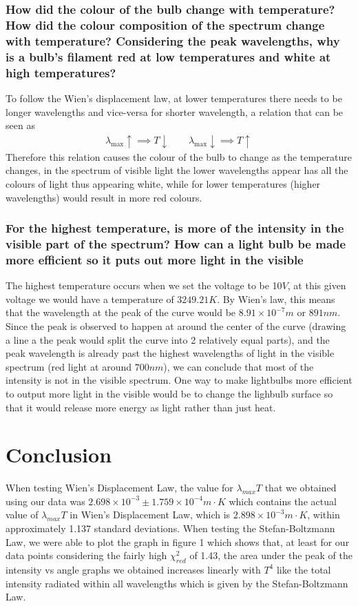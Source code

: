 \documentclass{article}
\begin{document}
\newpage
\subsubsection*{How did the colour of the bulb change with temperature? How did
the colour composition of the spectrum change with temperature? Considering the
peak wavelengths, why is a bulb's filament red at low temperatures and white at
high temperatures?}
To follow the Wien's displacement law, at lower temperatures there needs to be
longer wavelengths and vice-versa for shorter wavelength, a relation that can be
seen as 
\begin{align*}
    \lambda_{\max}\uparrow \implies T\downarrow \ \ \ \ \ \ \ \ \ 
    \lambda_{\max}\downarrow \implies T\uparrow
\end{align*}
Therefore this relation causes the colour of the bulb to change as the temperature
changes, in the spectrum of visible light the lower wavelengths appear has
all the colours of light thus appearing white, while for lower temperatures 
(higher wavelengths) would result in more red colours.

\newpage

\subsubsection*{For the highest temperature, is more of the intensity in the visible
part of the spectrum? How can a light bulb be made more efficient so it puts
out more light in the visible}
The highest temperature occurs when we set the voltage to be 10$V$, at this given
voltage we would have a temperature of $3249.21 K$. By Wien's law, this means that
the wavelength at the peak of the curve would be $8.91\times10^{-7}m$ or $891nm$.
Since the peak is observed to happen at around the center of the curve (drawing
a line a the peak would split the curve into 2 relatively equal parts), and the
peak wavelength is already past the highest wavelengths of light in the visible
spectrum (red light at around $700 nm$), we can conclude that most of the intensity
is not in the visible spectrum. One way to make lightbulbs more efficient to output
more light in the visible would be to change the lighbulb surface so that it would
release more energy as light rather than just heat.

\newpage

\section{Conclusion}
When testing Wien's Displacement Law, the value for $\lambda_{max}T$ that we obtained 
using our data was $2.698 \times 10^{-3} \pm 1.759 \times 10^{-4} m\cdot K$ which contains 
the actual value of $\lambda_{max}T$ in Wien's Displacement Law, which is $2.898 \times 
10^{-3} m\cdot K$, within approximately 1.137 standard deviations.  When testing the 
Stefan-Boltzmann Law, we were able to plot the graph in figure 1 which shows that, at least 
for our data points considering the fairly high $\chi^2_{red}$ of 1.43, the area under 
the peak of the intensity vs angle graphs we obtained increases linearly with $T^4$ like 
the total intensity radiated within all wavelengths which is given by the Stefan-Boltzmann Law.
\end{document}
